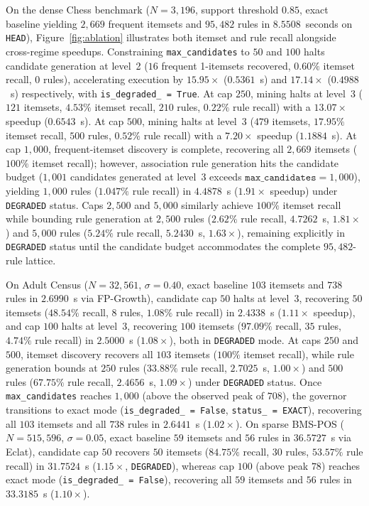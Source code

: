 \documentclass[journal,a4paper]{IEEEtran}
\begin{document}
On the dense Chess benchmark ($N=3{,}196$, support threshold $0.85$, exact baseline yielding $2{,}669$ frequent itemsets and $95{,}482$ rules in $8.5508$~seconds on \texttt{HEAD}), Figure~\ref{fig:ablation} illustrates both itemset and rule recall alongside cross-regime speedups. Constraining \texttt{max\_candidates} to $50$ and $100$ halts candidate generation at level~2 ($16$ frequent 1-itemsets recovered, $0.60\%$ itemset recall, $0$ rules), accelerating execution by $15.95\times$ ($0.5361$~s) and $17.14\times$ ($0.4988$~s) respectively, with \texttt{is\_degraded\_ = True}. At cap $250$, mining halts at level~3 ($121$ itemsets, $4.53\%$ itemset recall, $210$ rules, $0.22\%$ rule recall) with a $13.07\times$ speedup ($0.6543$~s). At cap $500$, mining halts at level~3 ($479$ itemsets, $17.95\%$ itemset recall, $500$ rules, $0.52\%$ rule recall) with a $7.20\times$ speedup ($1.1884$~s). At cap $1{,}000$, frequent-itemset discovery is complete, recovering all $2{,}669$ itemsets ($100\%$ itemset recall); however, association rule generation hits the candidate budget ($1{,}001$ candidates generated at level~3 exceeds $\texttt{max\_candidates}=1{,}000$), yielding $1{,}000$ rules ($1.047\%$ rule recall) in $4.4878$~s ($1.91\times$ speedup) under \texttt{DEGRADED} status. Caps $2{,}500$ and $5{,}000$ similarly achieve $100\%$ itemset recall while bounding rule generation at $2{,}500$ rules ($2.62\%$ rule recall, $4.7262$~s, $1.81\times$) and $5{,}000$ rules ($5.24\%$ rule recall, $5.2430$~s, $1.63\times$), remaining explicitly in \texttt{DEGRADED} status until the candidate budget accommodates the complete $95{,}482$-rule lattice.

On Adult Census ($N=32{,}561$, $\sigma=0.40$, exact baseline $103$ itemsets and $738$ rules in $2.6990$~s via FP-Growth), candidate cap $50$ halts at level~3, recovering $50$ itemsets ($48.54\%$ recall, $8$ rules, $1.08\%$ rule recall) in $2.4338$~s ($1.11\times$ speedup), and cap $100$ halts at level~3, recovering $100$ itemsets ($97.09\%$ recall, $35$ rules, $4.74\%$ rule recall) in $2.5000$~s ($1.08\times$), both in \texttt{DEGRADED} mode. At caps $250$ and $500$, itemset discovery recovers all $103$ itemsets ($100\%$ itemset recall), while rule generation bounds at $250$ rules ($33.88\%$ rule recall, $2.7025$~s, $1.00\times$) and $500$ rules ($67.75\%$ rule recall, $2.4656$~s, $1.09\times$) under \texttt{DEGRADED} status. Once \texttt{max\_candidates} reaches $1{,}000$ (above the observed peak of $708$), the governor transitions to exact mode (\texttt{is\_degraded\_ = False}, \texttt{status\_ = EXACT}), recovering all $103$ itemsets and all $738$ rules in $2.6441$~s ($1.02\times$). On sparse BMS-POS ($N=515{,}596$, $\sigma=0.05$, exact baseline $59$ itemsets and $56$ rules in $36.5727$~s via Eclat), candidate cap $50$ recovers $50$ itemsets ($84.75\%$ recall, $30$ rules, $53.57\%$ rule recall) in $31.7524$~s ($1.15\times$, \texttt{DEGRADED}), whereas cap $100$ (above peak $78$) reaches exact mode (\texttt{is\_degraded\_ = False}), recovering all $59$ itemsets and $56$ rules in $33.3185$~s ($1.10\times$).
\end{document}
